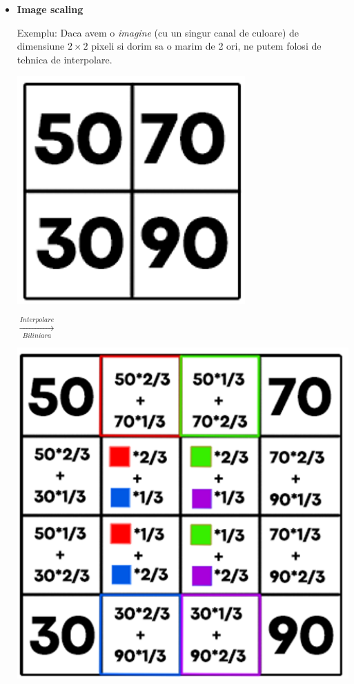 \documentclass{article}
\begin{document}
\begin{itemize}

    \item \textbf {Image scaling}
    
    \tabto{0.5cm} Exemplu: Daca avem o \textit{imagine} (cu un singur canal de culoare) de dimensiune $2\times2$ pixeli si dorim sa o marim de 2 ori, ne putem folosi de tehnica de interpolare.
    
    \;\;\;\;\;\;\;\;
    \begin{minipage}{0.225\textwidth}
        \includegraphics[scale=0.75]{img_scale_before}
    \end{minipage}
    {\LARGE$\xrightarrow[Biliniara]{Interpolare}$}\;\;
    \begin{minipage}{0.775\textwidth}
        \includegraphics[scale=1.5]{img_scale_after_color}
    \end{minipage}


\end{itemize}
\end{document}

